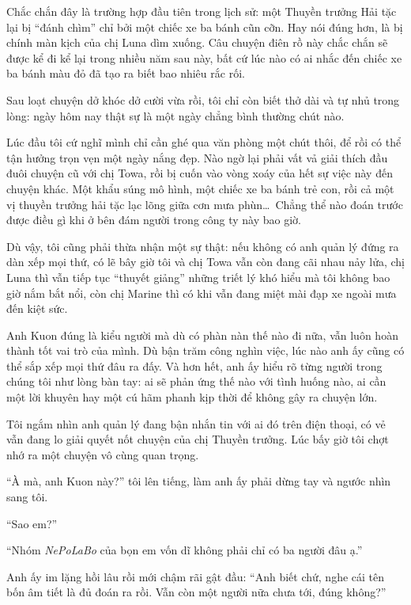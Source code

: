 \documentclass[../main.tex]{subfiles}
\begin{document}
Chắc chắn đây là trường hợp đầu tiên trong lịch sử: một Thuyền trưởng Hải tặc lại bị ``đánh chìm'' chỉ bởi một chiếc xe ba bánh cũn cỡn. Hay nói đúng hơn, là bị chính màn kịch của chị Luna dìm xuống. Câu chuyện điên rồ này chắc chắn sẽ được kể đi kể lại trong nhiều năm sau này, bất cứ lúc nào có ai nhắc đến chiếc xe ba bánh màu đỏ đã tạo ra biết bao nhiêu rắc rối.

\il

Sau loạt chuyện dở khóc dở cười vừa rồi, tôi chỉ còn biết thở dài và tự nhủ trong lòng: ngày hôm nay thật sự là một ngày chẳng bình thường chút nào.

Lúc đầu tôi cứ nghĩ mình chỉ cần ghé qua văn phòng một chút thôi, để rồi có thể tận hưởng trọn vẹn một ngày nắng đẹp. Nào ngờ lại phải vất vả giải thích đầu đuôi chuyện cũ với chị Towa, rồi bị cuốn vào vòng xoáy của hết sự việc này đến chuyện khác. Một khẩu súng mô hình, một chiếc xe ba bánh trẻ con, rồi cả một vị thuyền trưởng hải tặc lạc lõng giữa cơn mưa phùn\dots\ Chẳng thể nào đoán trước được điều gì khi ở bên đám người trong công ty này bao giờ.

Dù vậy, tôi cũng phải thừa nhận một sự thật: nếu không có anh quản lý đứng ra dàn xếp mọi thứ, có lẽ bây giờ tôi và chị Towa vẫn còn đang cãi nhau nảy lửa, chị Luna thì vẫn tiếp tục ``thuyết giảng'' những triết lý khó hiểu mà tôi không bao giờ nắm bắt nổi, còn chị Marine thì có khi vẫn đang miệt mài đạp xe ngoài mưa đến kiệt sức.

Anh Kuon đúng là kiểu người mà dù có phàn nàn thế nào đi nữa, vẫn luôn hoàn thành tốt vai trò của mình. Dù bận trăm công nghìn việc, lúc nào anh ấy cũng có thể sắp xếp mọi thứ đâu ra đấy. Và hơn hết, anh ấy hiểu rõ từng người trong chúng tôi như lòng bàn tay: ai sẽ phản ứng thế nào với tình huống nào, ai cần một lời khuyên hay một cú hãm phanh kịp thời để không gây ra chuyện lớn.

Tôi ngắm nhìn anh quản lý đang bận nhắn tin với ai đó trên điện thoại, có vẻ vẫn đang lo giải quyết nốt chuyện của chị Thuyền trưởng. Lúc bấy giờ tôi chợt nhớ ra một chuyện vô cùng quan trọng.

``À mà, anh Kuon này?'' tôi lên tiếng, làm anh ấy phải dừng tay và ngước nhìn sang tôi.

``Sao em?''

``Nhóm \textit{NePoLaBo} của bọn em vốn dĩ không phải chỉ có ba người đâu ạ.''

Anh ấy im lặng hồi lâu rồi mới chậm rãi gật đầu: ``Anh biết chứ, nghe cái tên bốn âm tiết là đủ đoán ra rồi. Vẫn còn một người nữa chưa tới, đúng không?''
\end{document}
